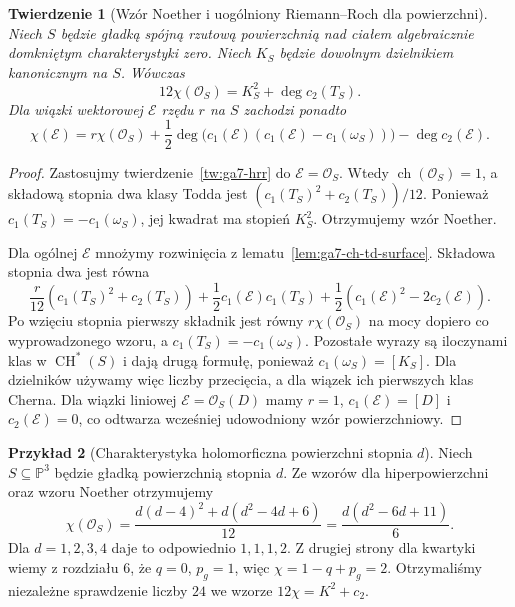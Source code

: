 \documentclass[11pt,a4paper,openany]{report}
\numberwithin{equation}{section}
\theoremstyle{plain}
\newtheorem{twierdzenie}{Twierdzenie}[section]
\theoremstyle{definition}
\newtheorem{przyklad}[twierdzenie]{Przykład}
\theoremstyle{remark}
\newcommand{\PP}{\mathbb P}
\begin{document}
\begin{twierdzenie}[Wzór Noether i uogólniony Riemann--Roch dla powierzchni]
\label{tw:ga7-noether}
Niech $S$ będzie gładką spójną rzutową powierzchnią
nad ciałem algebraicznie domkniętym charakterystyki zero.
Niech $K_S$ będzie dowolnym dzielnikiem kanonicznym na $S$.
Wówczas
\[
12\chi(\mathcal O_S)=K_S^2+\deg c_2(T_S).
\]
Dla wiązki wektorowej $\mathcal E$ rzędu $r$ na $S$
zachodzi ponadto
\[
\chi(\mathcal E)=r\chi(\mathcal O_S)
+\frac12\deg\bigl(c_1(\mathcal E)
(c_1(\mathcal E)-c_1(\omega_S))\bigr)
-\deg c_2(\mathcal E).
\]
\end{twierdzenie}
\begin{proof}
Zastosujmy twierdzenie~\ref{tw:ga7-hrr} do
$\mathcal E=\mathcal O_S$. Wtedy
$\operatorname{ch}(\mathcal O_S)=1$,
a składową stopnia dwa klasy Todda jest
$(c_1(T_S)^2+c_2(T_S))/12$.
Ponieważ $c_1(T_S)=-c_1(\omega_S)$, jej kwadrat
ma stopień $K_S^2$. Otrzymujemy wzór Noether.

Dla ogólnej $\mathcal E$ mnożymy rozwinięcia
z lematu~\ref{lem:ga7-ch-td-surface}. Składowa
stopnia dwa jest równa
\[
\frac r{12}(c_1(T_S)^2+c_2(T_S))
+\frac12c_1(\mathcal E)c_1(T_S)
+\frac12(c_1(\mathcal E)^2-2c_2(\mathcal E)).
\]
Po wzięciu stopnia pierwszy składnik jest równy
$r\chi(\mathcal O_S)$ na mocy dopiero co
wyprowadzonego wzoru, a
$c_1(T_S)=-c_1(\omega_S)$. Pozostałe wyrazy
są iloczynami klas w $\operatorname{CH}^*(S)$ i dają
drugą formułę, ponieważ $c_1(\omega_S)=[K_S]$.
Dla dzielników używamy więc liczby przecięcia,
a dla wiązek ich pierwszych klas Cherna.
Dla wiązki liniowej $\mathcal E=\mathcal O_S(D)$ mamy
$r=1$, $c_1(\mathcal E)=[D]$ i $c_2(\mathcal E)=0$,
co odtwarza wcześniej udowodniony wzór powierzchniowy.
\end{proof}

\begin{przyklad}[Charakterystyka holomorficzna powierzchni stopnia $d$]
Niech $S\subseteq\PP^3$ będzie gładką powierzchnią
stopnia $d$. Ze wzorów dla hiperpowierzchni oraz
wzoru Noether otrzymujemy
\[
\chi(\mathcal O_S)=\frac{d(d-4)^2+d(d^2-4d+6)}{12}
=\frac{d(d^2-6d+11)}6.
\]
Dla $d=1,2,3,4$ daje to odpowiednio $1,1,1,2$.
Z drugiej strony dla kwartyki wiemy z rozdziału 6,
że $q=0$, $p_g=1$, więc $\chi=1-q+p_g=2$.
Otrzymaliśmy niezależne sprawdzenie liczby $24$
we wzorze $12\chi=K^2+c_2$.
\end{przyklad}
\end{document}
